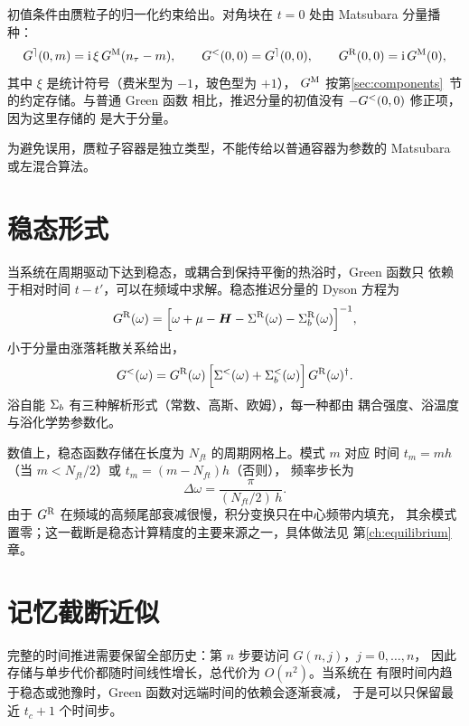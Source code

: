 初值条件由赝粒子的归一化约束给出。对角块在 $t=0$ 处由
Matsubara 分量播种：
\begin{equation}
    G^{\rceil}(0,m) = \mathrm{i}\,\xi\,G^{\mathrm{M}}(n_\tau-m),\qquad
    G^{<}(0,0) = G^{\rceil}(0,0),\qquad
    G^{\mathrm{R}}(0,0) = \mathrm{i}\,G^{\mathrm{M}}(0),
    \label{eq:pseudo-init}
\end{equation}
其中 $\xi$ 是统计符号（费米型为 $-1$，玻色型为 $+1$），
$G^{\mathrm{M}}$ 按第\ref{sec:components}~节的约定存储。与普通 Green 函数
相比，推迟分量的初值没有 $-G^{<}(0,0)$ 修正项，因为这里存储的
是大于分量。

为避免误用，赝粒子容器是独立类型，不能传给以普通容器为参数的
Matsubara 或左混合算法。

\section{稳态形式}
\label{sec:steady}

当系统在周期驱动下达到稳态，或耦合到保持平衡的热浴时，Green 函数只
依赖于相对时间 $t-t'$，可以在频域中求解。稳态推迟分量的 Dyson 方程为
\begin{equation}
    G^{\mathrm{R}}(\omega)
    =
    \Big[\omega + \mu - \bm{H} - \Sigma^{\mathrm{R}}(\omega)
      - \Sigma^{\mathrm{R}}_{b}(\omega)\Big]^{-1},
    \label{eq:steady-ret}
\end{equation}
小于分量由涨落耗散关系给出，
\begin{equation}
    G^{<}(\omega)
    =
    G^{\mathrm{R}}(\omega)\,
      \Big[\Sigma^{<}(\omega) + \Sigma^{<}_{b}(\omega)\Big]\,
      G^{\mathrm{R}}(\omega)^{\dagger}.
    \label{eq:steady-less}
\end{equation}
浴自能 $\Sigma_{b}$ 有三种解析形式（常数、高斯、欧姆），每一种都由
耦合强度、浴温度与浴化学势参数化。

数值上，稳态函数存储在长度为 $N_{ft}$ 的周期网格上。模式 $m$ 对应
时间 $t_m = m h$（当 $m<N_{ft}/2$）或 $t_m=(m-N_{ft})h$（否则），
频率步长为
\begin{equation}
    \Delta\omega = \frac{\pi}{(N_{ft}/2)\,h}.
    \label{eq:dw}
\end{equation}
由于 $G^{\mathrm{R}}$ 在频域的高频尾部衰减很慢，积分变换只在中心频带内填充，
其余模式置零；这一截断是稳态计算精度的主要来源之一，具体做法见
第\ref{ch:equilibrium}章。

\section{记忆截断近似}
\label{sec:truncation}

完整的时间推进需要保留全部历史：第 $n$ 步要访问 $G(n,j)$，$j=0,\dots,n$，
因此存储与单步代价都随时间线性增长，总代价为 $O(n^2)$。当系统在
有限时间内趋于稳态或弛豫时，Green 函数对远端时间的依赖会逐渐衰减，
于是可以只保留最近 $t_c+1$ 个时间步。


